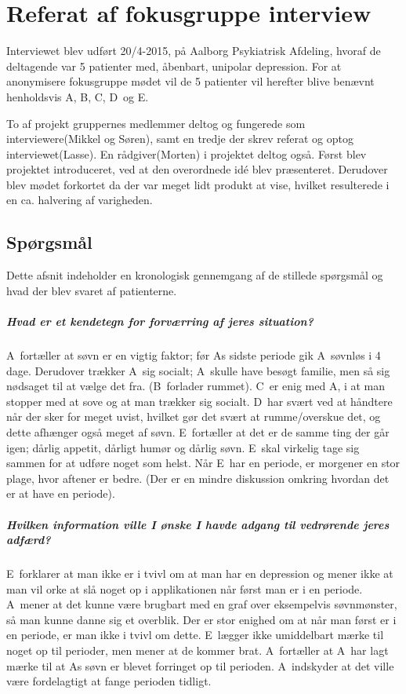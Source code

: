 \chapter{Referat af fokusgruppe interview}\label{app:fokusgruppe-interview-referat}
\newcommand{\pa}{A}
\newcommand{\pb}{B}
\newcommand{\pc}{C}
\newcommand{\pd}{D}
\newcommand{\pe}{E}

Interviewet blev udført 20/4-2015, på Aalborg Psykiatrisk Afdeling, hvoraf de deltagende var 5 patienter med, åbenbart, unipolar depression.
For at anonymisere fokusgruppe mødet vil de 5 patienter vil herefter blive benævnt henholdsvis \pa, \pb, \pc, \pd~og \pe.

To af projekt gruppernes medlemmer deltog og fungerede som interviewere(Mikkel og Søren), samt en tredje der skrev referat og optog interviewet(Lasse). En rådgiver(Morten) i projektet deltog også.
Først blev projektet introduceret, ved at den overordnede idé blev præsenteret.
Derudover blev mødet forkortet da der var meget lidt produkt at vise, hvilket resulterede i en ca. halvering af varigheden.

\section{Spørgsmål}
Dette afsnit indeholder en kronologisk gennemgang af de stillede spørgsmål og hvad der blev svaret af patienterne.

\paragraph{Hvad er et kendetegn for forværring af jeres situation?}
\pa~fortæller at søvn er en vigtig faktor; før \pa s sidste periode gik \pa~søvnløs i 4 dage.
Derudover trækker \pa~sig socialt; \pa~skulle have besøgt familie, men så sig nødsaget til at vælge det fra.
(\pb~forlader rummet).
\pc~er enig med \pa, i at man stopper med at sove og at man trækker sig socialt.
\pd~har svært ved at håndtere når der sker for meget uvist, hvilket gør det svært at rumme/overskue det, og dette afhænger også meget af søvn.
\pe~fortæller at det er de samme ting der går igen; dårlig appetit, dårligt humør og dårlig søvn.
\pe~skal virkelig tage sig sammen for at udføre noget som helst.
Når \pe~har en periode, er morgener en stor plage, hvor aftener er bedre.
(Der er en mindre diskussion omkring hvordan det er at have en periode).

\paragraph{Hvilken information ville I ønske I havde adgang til vedrørende jeres adfærd?}
\pe~forklarer at man ikke er i tvivl om at man har en depression og mener ikke at man vil orke at slå noget op i applikationen når først man er i en periode.
\pa~mener at det kunne være brugbart med en graf over eksempelvis søvnmønster, så man kunne danne sig et overblik.
Der er stor enighed om at når man først er i en periode, er man ikke i tvivl om dette.
\pe~lægger ikke umiddelbart mærke til noget op til perioder, men mener at de kommer brat.
\pa~fortæller at \pa~har lagt mærke til at \pa s søvn er blevet forringet op til perioden.
\pa~indskyder at det ville være fordelagtigt at fange perioden tidligt.

